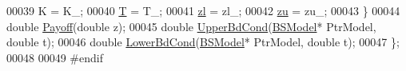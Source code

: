 \begin{DoxyCode}
00039       K = K\_;
00040       \hyperlink{classOption_ae583dd6d430a3b428014efa942605d54}{T} = T\_;
00041       \hyperlink{classOption_a37c65100e75876d4f4b76e8647c6702d}{zl} = zl\_;
00042       \hyperlink{classOption_aa80c6f304df39def3df2bf26afbbfe79}{zu} = zu\_;
00043     \}
00044     \textcolor{keywordtype}{double} \hyperlink{classPut_ae2bbadeb2c9f05644ef9b9af97ad7520}{Payoff}(\textcolor{keywordtype}{double} z);
00045     \textcolor{keywordtype}{double} \hyperlink{classPut_ac15aea264781b4f426b68918ab73a27d}{UpperBdCond}(\hyperlink{classBSModel}{BSModel}* PtrModel, \textcolor{keywordtype}{double} t);
00046     \textcolor{keywordtype}{double} \hyperlink{classPut_ab07d0f1d939f267861484f645d71c9c5}{LowerBdCond}(\hyperlink{classBSModel}{BSModel}* PtrModel, \textcolor{keywordtype}{double} t);
00047 \};
00048 
00049 \textcolor{preprocessor}{#endif}
\end{DoxyCode}

